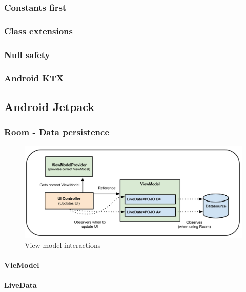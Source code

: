\documentclass[11pt,a4paper]{report}
\begin{document}
\subsubsection{Constants first}
\subsubsection{Class extensions}
\subsubsection{Null safety}

\subsubsection{Android KTX}
\subsection{Android Jetpack}
\subsubsection{Room - Data persistence}
\begin{figure}[H]
\begin{center}
	\includegraphics[width=.8\textwidth]{assets/viewmodel}
	\caption{View model interactions\cite{android:doc:viewmodel}}
\end{center}
\end{figure}
\paragraph{VieModel}
\paragraph{LiveData}
\end{document}

